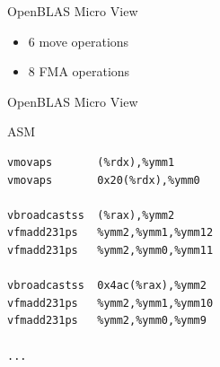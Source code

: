 \documentclass[UKenglish]{beamer}
\begin{document}
\begin{frame}[c]{OpenBLAS Micro View}
\begin{center}
         {
            \begin{itemize}
                \item 6 move operations
                \item 8 FMA operations
            \end{itemize}
        }
    \end{center}
\end{frame}

\begin{frame}[fragile, c]{OpenBLAS Micro View}
    \begin{exampleblock}{ASM}
        \begin{verbatim}
vmovaps       (%rdx),%ymm1
vmovaps       0x20(%rdx),%ymm0

vbroadcastss  (%rax),%ymm2
vfmadd231ps   %ymm2,%ymm1,%ymm12
vfmadd231ps   %ymm2,%ymm0,%ymm11

vbroadcastss  0x4ac(%rax),%ymm2
vfmadd231ps   %ymm2,%ymm1,%ymm10
vfmadd231ps   %ymm2,%ymm0,%ymm9

...
\end{verbatim}
    \end{exampleblock}
\end{frame}
\end{document}
